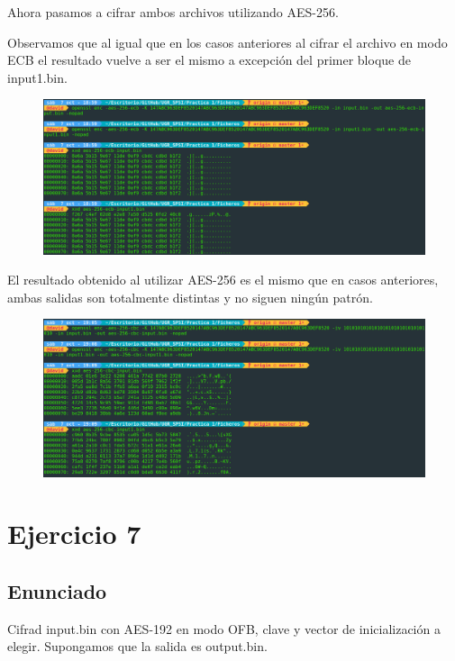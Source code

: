 \documentclass[10pt,a4paper,spanish]{report}
\begin{document}
\newpage
\noindent
Ahora pasamos a cifrar ambos archivos utilizando AES-256.

\noindent
Observamos que al igual que en los casos anteriores al cifrar el archivo en modo ECB el resultado vuelve a ser el mismo a excepción del primer bloque de input1.bin.

\begin{figure}[!hbp]
 \centering  \includegraphics[width=1\textwidth]{./Imagenes/12.png}
\end{figure}

\noindent
El resultado obtenido al utilizar AES-256 es el mismo que en casos anteriores, ambas salidas son totalmente distintas y no siguen ningún patrón.

\begin{figure}[!hbp]
 \centering  \includegraphics[width=1\textwidth]{./Imagenes/13.png}
\end{figure}


\chapter{Ejercicio 7}

\section{Enunciado}
\noindent
Cifrad input.bin con AES-192 en modo OFB, clave y vector de inicialización a elegir. Supongamos que la salida es output.bin.
\end{document}
